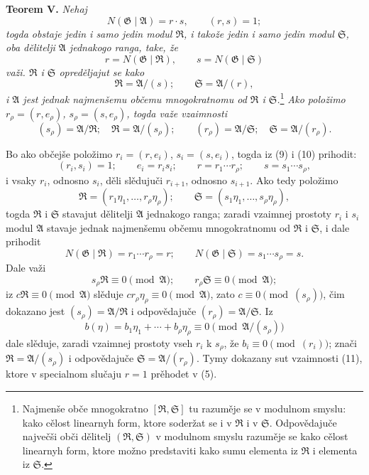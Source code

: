 \documentclass[11pt]{article}
\providecommand{\Amod}{\mathfrak A}
\providecommand{\Gmod}{\mathfrak G}
\providecommand{\Rmod}{\mathfrak R}
\providecommand{\Smod}{\mathfrak S}
\providecommand{\zero}[1]{\equiv 0\pmod{#1}}
\providecommand{\Norm}{N}
\begin{document}
\medskip
\noindent\textbf{Teorem V.} \emph{Nehaj}
\begin{equation}
 \Norm(\Gmod\mid\Amod)=r\cdot s,\qquad (r,s)=1;
\tag{10}
\end{equation}
\emph{togda obstaje jedin i samo jedin modul $\Rmod$, i takože jedin i samo jedin modul $\Smod$, oba dělitelji $\Amod$ jednakogo ranga, take, že}
\[
 r=\Norm(\Gmod\mid\Rmod),\qquad s=\Norm(\Gmod\mid\Smod)
\]
\emph{važi. $\Rmod$ i $\Smod$ opreděljajut se kako}
\[
 \Rmod=\Amod/(s);\qquad \Smod=\Amod/(r),
\]
\emph{i $\Amod$ jest jednak najmenšemu občemu mnogokratnomu od $\Rmod$ i $\Smod$.}\footnote{Najmenše obče mnogokratno $[\Rmod,\Smod]$ tu razuměje se v modulnom smyslu: kako cělost linearnyh form, ktore soderžat se i v $\Rmod$ i v $\Smod$. Odpovědajuče največši obči dělitelj $(\Rmod,\Smod)$ v modulnom smyslu razuměje se kako cělost linearnyh form, ktore možno predstaviti kako sumu elementa iz $\Rmod$ i elementa iz $\Smod$.}
\emph{Ako položimo $r_\rho=(r,e_\rho)$, $s_\rho=(s,e_\rho)$, togda važe vzaimnosti}
\begin{equation}
 (s_\rho)=\Amod/\Rmod;\quad \Rmod=\Amod/(s_\rho);
 \qquad
 (r_\rho)=\Amod/\Smod;\quad \Smod=\Amod/(r_\rho).
\tag{11}
\end{equation}

Bo ako občejše položimo $r_i=(r,e_i)$, $s_i=(s,e_i)$, togda iz (9) i (10) prihodit:
\[
 (r_i,s_i)=1;\qquad e_i=r_is_i;\qquad r=r_1\cdots r_\rho;\qquad s=s_1\cdots s_\rho,
\]
i vsaky $r_i$, odnosno $s_i$, děli slědujuči $r_{i+1}$, odnosno $s_{i+1}$. Ako tedy položimo
\[
 \Rmod=(r_1\eta_1,\ldots,r_\rho\eta_\rho);\qquad
 \Smod=(s_1\eta_1,\ldots,s_\rho\eta_\rho),
\]
togda $\Rmod$ i $\Smod$ stavajut dělitelji $\Amod$ jednakogo ranga; zaradi vzaimnej prostoty $r_i$ i $s_i$ modul $\Amod$ stavaje jednak najmenšemu občemu mnogokratnomu od $\Rmod$ i $\Smod$, i dale prihodit
\[
 \Norm(\Gmod\mid\Rmod)=r_1\cdots r_\rho=r;\qquad
 \Norm(\Gmod\mid\Smod)=s_1\cdots s_\rho=s.
\]
Dale važi
\[
 s_\rho\Rmod\zero{\Amod};\qquad r_\rho\Smod\zero{\Amod};
\]
iz $c\Rmod\zero{\Amod}$ slěduje $cr_\rho\eta_\rho\zero{\Amod}$, zato $c\zero{(s_\rho)}$, čim dokazano jest $(s_\rho)=\Amod/\Rmod$ i odpovědajuče $(r_\rho)=\Amod/\Smod$. Iz
\[
 b(\eta)=b_1\eta_1+\cdots+b_\rho\eta_\rho\zero{\Amod/(s_\rho)}
\]
dale slěduje, zaradi vzaimnej prostoty vseh $r_i$ k $s_\rho$, že $b_i\zero{(r_i)}$; znači $\Rmod=\Amod/(s_\rho)$ i odpovědajuče $\Smod=\Amod/(r_\rho)$. Tymy dokazany sut vzaimnosti (11), ktore v specialnom slučaju $r=1$ prěhodet v (5).
\end{document}
